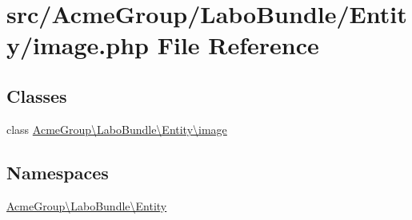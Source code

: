 \hypertarget{image_8php}{\section{src/\+Acme\+Group/\+Labo\+Bundle/\+Entity/image.php File Reference}
\label{image_8php}
}
\subsection*{Classes}
\begin{DoxyCompactItemize}
\item 
class \hyperlink{class_acme_group_1_1_labo_bundle_1_1_entity_1_1image}{Acme\+Group\textbackslash{}\+Labo\+Bundle\textbackslash{}\+Entity\textbackslash{}image}
\end{DoxyCompactItemize}
\subsection*{Namespaces}
\begin{DoxyCompactItemize}
\item 
 \hyperlink{namespace_acme_group_1_1_labo_bundle_1_1_entity}{Acme\+Group\textbackslash{}\+Labo\+Bundle\textbackslash{}\+Entity}
\end{DoxyCompactItemize}
